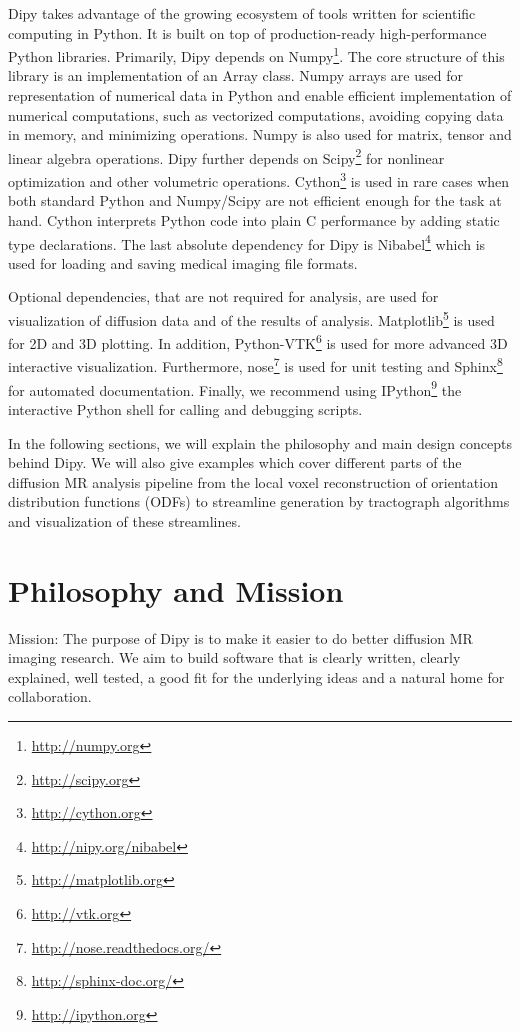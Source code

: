 \documentclass{bioinfo}
\begin{document}
Dipy takes advantage of the growing ecosystem of tools written for scientific
computing in Python. It is built on top of production-ready high-performance
Python libraries. Primarily, Dipy depends on
Numpy\footnote{\url{http://numpy.org}}. The core structure of this library is
an implementation of an Array \citep{van_numpy:11} class. Numpy arrays are used
for representation of numerical data in Python and enable efficient
implementation of numerical computations, such as vectorized computations,
avoiding copying data in memory, and minimizing operations. Numpy is also used
for matrix, tensor and linear algebra operations.  Dipy further depends on
Scipy\footnote{\url{http://scipy.org}} for nonlinear optimization and other
volumetric operations. Cython\footnote{\url{http://cython.org}} is used in rare
cases when both standard Python and Numpy/Scipy are not efficient enough for
the task at hand. Cython interprets Python code into plain C performance by
adding static type declarations. The last absolute dependency for Dipy is
Nibabel\footnote{\url{http://nipy.org/nibabel}} which is used for loading and
saving medical imaging file formats.

Optional dependencies, that are not required for analysis, are used for
visualization of diffusion data and of the results of
analysis. Matplotlib\footnote{\url{http://matplotlib.org}} is used for 2D and
3D plotting. In addition, Python-VTK\footnote{\url{http://vtk.org}} is used for
more advanced 3D interactive visualization. Furthermore, nose\footnote{\url{http://nose.readthedocs.org/}} 
is used for unit
testing and Sphinx\footnote{\url{http://sphinx-doc.org/}} for automated
documentation. Finally, we recommend using
IPython\footnote{\url{http://ipython.org}} the interactive Python shell for
calling and debugging scripts.

In the following sections, we will explain the philosophy and main design
concepts behind Dipy. We will also give examples which cover different parts of
the diffusion MR analysis pipeline from the local voxel reconstruction of
orientation distribution functions (ODFs) to streamline generation by
tractograph algorithms and visualization of these streamlines.

\section{Philosophy and Mission}

Mission: The purpose of Dipy is to make it easier to do better diffusion MR
imaging research. We aim to build software that is clearly written, clearly
explained, well tested, a good fit for the underlying ideas and a natural home
for collaboration.
\end{document}
